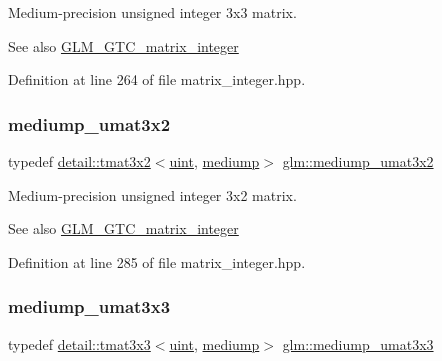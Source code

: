 Medium-\/precision unsigned integer 3x3 matrix. \begin{DoxySeeAlso}{See also}
\hyperlink{group__gtc__matrix__integer}{G\+L\+M\+\_\+\+G\+T\+C\+\_\+matrix\+\_\+integer} 
\end{DoxySeeAlso}


Definition at line 264 of file matrix\+\_\+integer.\+hpp.

\mbox{\label{group__gtc__matrix__integer_ga65a9fdb1a5918fe6f308577065983e23}} 
\subsubsection{\texorpdfstring{mediump\+\_\+umat3x2}{mediump\_umat3x2}}
{\footnotesize\ttfamily typedef \hyperlink{structglm_1_1detail_1_1tmat3x2}{detail\+::tmat3x2}$<$\hyperlink{group__core__precision_ga4fd29415871152bfb5abd588334147c8}{uint}, \hyperlink{namespaceglm_a0f04f086094c747d227af4425893f545a6416f3ea0c9025fb21ed50c4d6620482}{mediump}$>$ \hyperlink{group__gtc__matrix__integer_ga65a9fdb1a5918fe6f308577065983e23}{glm\+::mediump\+\_\+umat3x2}}

Medium-\/precision unsigned integer 3x2 matrix. \begin{DoxySeeAlso}{See also}
\hyperlink{group__gtc__matrix__integer}{G\+L\+M\+\_\+\+G\+T\+C\+\_\+matrix\+\_\+integer} 
\end{DoxySeeAlso}


Definition at line 285 of file matrix\+\_\+integer.\+hpp.

\mbox{\label{group__gtc__matrix__integer_ga31a05e7b2a6a596bdc7ceeb5d9c10e1c}} 
\subsubsection{\texorpdfstring{mediump\+\_\+umat3x3}{mediump\_umat3x3}}
{\footnotesize\ttfamily typedef \hyperlink{structglm_1_1detail_1_1tmat3x3}{detail\+::tmat3x3}$<$\hyperlink{group__core__precision_ga4fd29415871152bfb5abd588334147c8}{uint}, \hyperlink{namespaceglm_a0f04f086094c747d227af4425893f545a6416f3ea0c9025fb21ed50c4d6620482}{mediump}$>$ \hyperlink{group__gtc__matrix__integer_ga31a05e7b2a6a596bdc7ceeb5d9c10e1c}{glm\+::mediump\+\_\+umat3x3}}

